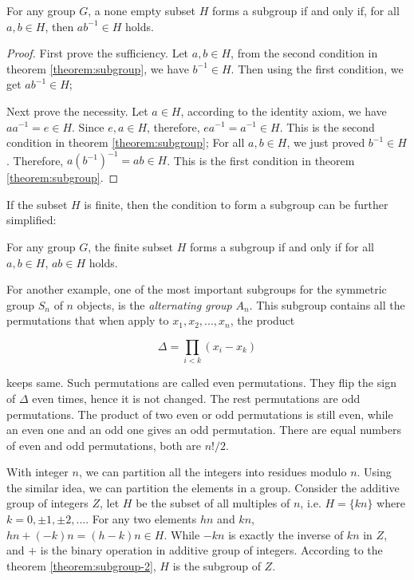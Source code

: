 \documentclass[b5paper]{article}
\begin{document}
\begin{theorem}
For any group $G$, a none empty subset $H$ forms a subgroup if and only if, for all $a, b \in H$, then $ab^{-1} \in H$ holds.
\label{theorem:subgroup-2}
\end{theorem}

\begin{proof}
First prove the sufficiency. Let $a, b \in H$, from the second condition in theorem \ref{theorem:subgroup}, we have $b^{-1} \in H$. Then using the first condition, we get $ab^{-1} \in H$;

Next prove the necessity. Let $a \in H$, according to the identity axiom, we have $aa^{-1} = e \in H$. Since $e, a \in H$, therefore, $ea^{-1} = a^{-1} \in H$. This is the second condition in theorem \ref{theorem:subgroup}; For all $a, b \in H$, we just proved $b^{-1} \in H$. Therefore, $a(b^{-1})^{-1} = ab \in H$. This is the first condition in theorem \ref{theorem:subgroup}.
\end{proof}

If the subset $H$ is finite, then the condition to form a subgroup can be further simplified:

\begin{theorem}
For any group $G$, the finite subset $H$ forms a subgroup if and only if for all $a, b \in H$, $ab \in H$ holds.
\end{theorem}

For another example, one of the most important subgroups for the symmetric group $S_n$ of $n$ objects, is the {\em alternating group} $A_n$. This subgroup contains all the permutations that when apply to $x_1, x_2, ..., x_n$, the product

\[
\Delta = \displaystyle \prod_{i < k} (x_i - x_k)
\]

keeps same. Such permutations are called even permutations. They flip the sign of $\Delta$ even times, hence it is not changed. The rest permutations are odd permutations. The product of two even or odd permutations is still even, while an even one and an odd one gives an odd permutation. There are equal numbers of even and odd permutations, both are $n!/2$.

With integer $n$, we can partition all the integers into residues modulo $n$. Using the similar idea, we can partition the elements in a group. Consider the additive group of integers $Z$, let $H$ be the subset of all multiples of $n$, i.e. $H = \{ kn \}$ where $k = 0, \pm 1, \pm 2, ...$. For any two elements $hn$ and $kn$, $hn + (-k)n = (h - k)n \in H$. While $-kn$ is exactly the inverse of $kn$ in $Z$, and $+$ is the binary operation in additive group of integers. According to the theorem \ref{theorem:subgroup-2}, $H$ is the subgroup of $Z$.
\end{document}
